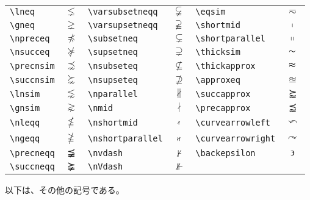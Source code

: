 \begin{longtable}{@{}lclclc@{}}
  \verb`\lneq`              & $\lneq$              & \verb`\varsubsetneqq`       & $\varsubsetneqq$       & \verb`\eqsim`            & $\eqsim$            \\
  \verb`\gneq`              & $\gneq$              & \verb`\varsupsetneqq`       & $\varsupsetneqq$       & \verb`\shortmid`         & $\shortmid$         \\
  \verb`\npreceq`           & $\npreceq$           & \verb`\subsetneq`           & $\subsetneq$           & \verb`\shortparallel`    & $\shortparallel$    \\
  \verb`\nsucceq`           & $\nsucceq$           & \verb`\supsetneq`           & $\supsetneq$           & \verb`\thicksim`         & $\thicksim$         \\
  \verb`\precnsim`          & $\precnsim$          & \verb`\nsubseteq`           & $\nsubseteq$           & \verb`\thickapprox`      & $\thickapprox$      \\
  \verb`\succnsim`          & $\succnsim$          & \verb`\nsupseteq`           & $\nsupseteq$           & \verb`\approxeq`         & $\approxeq$         \\
  \verb`\lnsim`             & $\lnsim$             & \verb`\nparallel`           & $\nparallel$           & \verb`\succapprox`       & $\succapprox$       \\
  \verb`\gnsim`             & $\gnsim$             & \verb`\nmid`                & $\nmid$                & \verb`\precapprox`       & $\precapprox$       \\
  \verb`\nleqq`             & $\nleqq$             & \verb`\nshortmid`           & $\nshortmid$           & \verb`\curvearrowleft`   & $\curvearrowleft$   \\
  \verb`\ngeqq`             & $\ngeqq$             & \verb`\nshortparallel`      & $\nshortparallel$      & \verb`\curvearrowright`  & $\curvearrowright$  \\
  \verb`\precneqq`          & $\precneqq$          & \verb`\nvdash`              & $\nvdash$              & \verb`\backepsilon`      & $\backepsilon$      \\
  \verb`\succneqq`          & $\succneqq$          & \verb`\nVdash`              & $\nVdash$              &                          &                     \\
\end{longtable}
以下は、その他の記号である。
